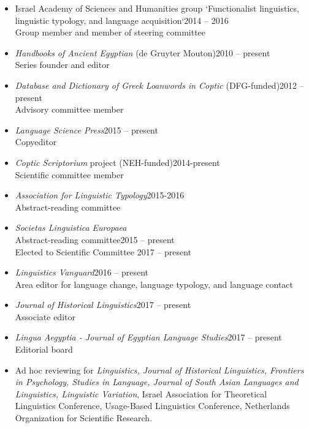 \documentclass[letterpaper,11pt]{article}
\begin{document}
\begin{itemize}
\vspace{-0.025 in}
\vspace*{-2pt}
\item Israel Academy of Sciences and Humanities group `Functionalist linguistics, linguistic typology, and language acquisition`\hfill{2014 -- 2016}\\
Group member and member of steering committee\\

\item \textit{Handbooks of Ancient Egyptian} (de Gruyter Mouton)\hfill{2010 -- present}\\Series founder and editor 

\item \textit{Database and Dictionary of Greek Loanwords in Coptic} (DFG-funded)\hfill{2012 -- present}\\Advisory committee member

\item \textit{Language Science Press}\hfill{2015 -- present}\\Copyeditor

\item \textit{Coptic Scriptorium} project (NEH-funded)\hfill{2014-present}\\Scientific committee member		

\item \textit{Association for Linguistic Typology}\hfill{2015-2016}	\\Abstract-reading committee

\item \textit{Societas Linguistica Europaea}\\Abstract-reading committee\hfill{2015 -- present}\\Elected to Scientific Committee \hfill{2017 -- present}

\item \textit{Linguistics Vanguard}\hfill{2016 -- present}\\Area editor for language change, language typology, and language contact
\item \textit{Journal of Historical Linguistics}\hfill{2017 -- present}\\Associate editor
\item {\textit{Lingua Aegyptia - Journal of Egyptian Language Studies}\hfill{2017 -- present}\\Editorial board}

\item Ad hoc reviewing for \textit{Linguistics, Journal of Historical Linguistics, Frontiers in Psychology, Studies in Language, Journal of South Asian Languages and Linguistics, Linguistic Variation}, Israel Association for Theoretical Linguistics Conference, Usage-Based Linguistics Conference, Netherlands Organization for Scientific Research.
 
\end{itemize}
\end{document}
